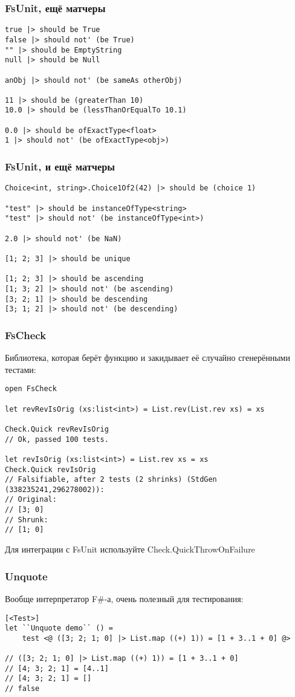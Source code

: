 \documentclass[xetex,mathserif,serif]{beamer}
\begin{document}
    \begin{frame}[fragile]
        \frametitle{FsUnit, ещё матчеры}
        \begin{verbatim}
true |> should be True
false |> should not' (be True)
"" |> should be EmptyString
null |> should be Null

anObj |> should not' (be sameAs otherObj)

11 |> should be (greaterThan 10)
10.0 |> should be (lessThanOrEqualTo 10.1)

0.0 |> should be ofExactType<float>
1 |> should not' (be ofExactType<obj>)
        \end{verbatim}
    \end{frame}

    \begin{frame}[fragile]
        \frametitle{FsUnit, и ещё матчеры}
        \begin{verbatim}
Choice<int, string>.Choice1Of2(42) |> should be (choice 1)

"test" |> should be instanceOfType<string>
"test" |> should not' (be instanceOfType<int>)

2.0 |> should not' (be NaN)

[1; 2; 3] |> should be unique

[1; 2; 3] |> should be ascending
[1; 3; 2] |> should not' (be ascending)
[3; 2; 1] |> should be descending
[3; 1; 2] |> should not' (be descending)
        \end{verbatim}
    \end{frame}

    \begin{frame}[fragile]
        \frametitle{FsCheck}
        Библиотека, которая берёт функцию и закидывает её случайно сгенерёнными тестами:
        \begin{verbatim}
open FsCheck

let revRevIsOrig (xs:list<int>) = List.rev(List.rev xs) = xs

Check.Quick revRevIsOrig
// Ok, passed 100 tests.

let revIsOrig (xs:list<int>) = List.rev xs = xs
Check.Quick revIsOrig
// Falsifiable, after 2 tests (2 shrinks) (StdGen (338235241,296278002)):
// Original:
// [3; 0]
// Shrunk:
// [1; 0]
        \end{verbatim}
        Для интеграции с FsUnit используйте Check.QuickThrowOnFailure
    \end{frame}

    \begin{frame}[fragile]
        \frametitle{Unquote}
        Вообще интерпретатор F\#-а, очень полезный для тестирования:
        \begin{verbatim}
[<Test>]
let ``Unquote demo`` () =
    test <@ ([3; 2; 1; 0] |> List.map ((+) 1)) = [1 + 3..1 + 0] @>

// ([3; 2; 1; 0] |> List.map ((+) 1)) = [1 + 3..1 + 0]
// [4; 3; 2; 1] = [4..1]
// [4; 3; 2; 1] = []
// false
        \end{verbatim}
    \end{frame}
\end{document}
